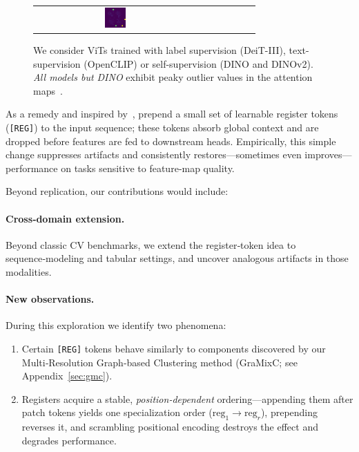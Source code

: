 \documentclass{article}
\newcommand{\RegTok}{\texttt{[REG]}\xspace}
\newcommand{\citet}{\textcite}
\begin{document}
\begin{figure}[h]
{\begin{tabular}{c cc cc cc }
      \includegraphics[width=0.13\textwidth]{resources/230914_1202_fig2_vizs_various_models/vit_giant_patch14_dinov2.lvd142m_1753_lastattmap.png}
      \\
    \end{tabular}
    }
    \caption{
      We consider ViTs trained with label supervision (DeiT-III), text-supervision (OpenCLIP) or self-supervision (DINO and DINOv2).
      \emph{All models but DINO} exhibit peaky outlier values in the attention maps~\cite{darcetVisionTransformersNeed2024}.
    }  
    \label{fig:allvits}
\end{figure}

As a remedy and inspired by~\citet{bulatovRecurrentMemoryTransformer2022}, \citet{darcetVisionTransformersNeed2024} prepend a small set of learnable register tokens (\RegTok) to the input sequence; these tokens absorb global context and are dropped before features are fed to downstream heads. 
Empirically, this simple change suppresses artifacts and consistently restores—sometimes even improves—performance on tasks sensitive to feature‑map quality.

Beyond replication, our contributions would include:

\paragraph{Cross‑domain extension.}
Beyond classic CV benchmarks, we extend the register‑token idea to sequence‑modeling and tabular settings, and uncover analogous artifacts in those modalities.

\paragraph{New observations.}
During this exploration we identify two phenomena:  
\begin{enumerate}
    \item Certain \RegTok tokens behave similarly to components discovered by our
          Multi‑Resolution Graph‑based Clustering method (GraMixC; see Appendix~\ref{sec:gmc}).
    \item Registers acquire a stable, \emph{position‑dependent} ordering—appending them
          after patch tokens yields one specialization order ($\text{reg}_1\!\rightarrow\!\text{reg}_r$),
          prepending reverses it, and scrambling positional encoding destroys the effect and
          degrades performance.
\end{enumerate}
\end{document}

